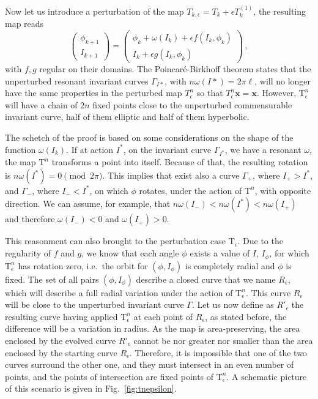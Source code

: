 Now let us introduce a perturbation of the map $T_{k,\epsilon} = T_k + \epsilon T^{(1)}_k$, the resulting map reads
\begin{equation}
	\begin{pmatrix} \phi_{k+1} \\ I_{k+1} \end{pmatrix}  = \begin{pmatrix} \phi_k + \omega(I_k) + \epsilon f(I_k, \phi_k) \\ I_k  + \epsilon g(I_k, \phi_k) \end{pmatrix} \, ,
\end{equation}
with $f, g$ regular on their domains. The Poincaré-Birkhoff theorem states that the unperturbed resonant invariant curves $\Gamma_{I*}$, with $n\omega(I*)=2\pi \ell$, will no longer have the same properties in the perturbed map $T_\epsilon^n$ so that $T_\epsilon^n \mathbf{x} = \mathbf{x}$. However, $\mathrm{T}^n_\epsilon$ will have a chain of $2n$ fixed points close to the unperturbed commensurable invariant curve, half of them elliptic and half of them hyperbolic.

The schetch of the proof is based on some considerations on the shape of the function $\omega(I_k)$. If at action $I^*$, on the invariant curve $\Gamma_{I^*}$, we have a resonant $\omega$, the map $\mathrm{T}^n$ transforms a point into itself. Because of that, the resulting rotation is $n\omega(I^*)=0 \pmod{2\pi}$. This implies that exist also a curve $\Gamma_+$, where $I_+>I^*$, and $\Gamma_-$, where $I_-<I^*$, on which $\phi$ rotates, under the action of $\mathrm{T}^n$, with opposite direction. We can assume, for example, that $n\omega(I_-)<n\omega(I^*)<n\omega(I_+)$ and therefore $\omega(I_-)<0$ and $\omega(I_+)>0$.

This reasonment can also brought to the perturbation case $\mathrm{T}_\epsilon$. Due to the regularity of $f$ and $g$, we know that each angle $\phi$ exists a value of $I$, $I_\phi$, for which $\mathrm{T}^n_\epsilon$ has rotation zero, i.e.\ the orbit for $(\phi, I_\phi)$ is completely radial and $\phi$ is fixed. The set of all pairs $(\phi, I_\phi)$ describe a closed curve that we name $R_\epsilon$, which will describe a full radial variation under the action of $\mathrm{T}^n_\epsilon$. This curve $R_\epsilon$ will be close to the unperturbed invariant curve $\Gamma$. Let us now define as $R'_\epsilon$ the resulting curve having applied $\mathrm{T}^n_\epsilon$ at each point of $R_\epsilon$, as stated before, the difference will be a variation in radius. As the map is area-preserving, the area enclosed by the evolved curve $R'_\epsilon$ cannot be nor greater nor smaller than the area enclosed by the starting curve $R_\epsilon$. Therefore, it is impossible that one of the two curves surround the other one, and they must intersect in an even number of points, and the points of intersection are fixed points of $\mathrm{T}^n_\epsilon$. A schematic picture of this scenario is given in Fig.~\ref{fig:tnepsilon}.

